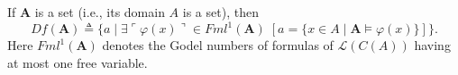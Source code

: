 If $\mathbf{A}$ is a set (i.e., its domain $A$ is a set), then
$$Df(\mathbf{A}) \triangleq \{a \mid \exists \ulcorner \varphi(x) \urcorner \in Fml^1(\mathbf{A}) \; [a = \{x \in A \mid \mathbf{A} \models \varphi(x)\}]\}.$$
Here $Fml^1(\mathbf{A})$ denotes the Godel numbers of formulas of $\mathcal{L}(C(A))$ having at most one free variable.
